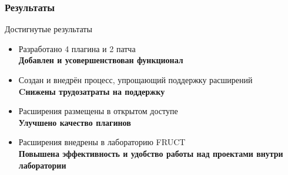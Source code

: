 \documentclass[unicode]{beamer}
\begin{document}
\begin{comment}

На слайде отображена страница с одним из плагинов на хостинге проектов гитхаб.

Исходные коды расширений были размещены в открытом доступе. Один из патчей был
размещен на официальном сайте Redmine и ждёт рассмотрения на принятие в кодовую
базу проекта. Патч, который вносит улучшения в плагин для обзора кода, был
принят автором плагина и текущая версия плагина уже содержит данное улучшение.

Исходные коды 4 разработанных плагинов выложены на хостинг проектов github. Был
произведён анонс одного из плагинов, для того, чтобы привлечь пользователей.
При помощи подобной рекламы было получено было получено 6 отзывов и 3 патча от
8 пользователей. Списое отзывов и патчей отображены на слайде.
Полученные патчи были приняты в кодовую базу плагина, а на основе отзывов
внесены улучшения. Стоит отметить, что один из пользователей портировал плагин
в схожую систему управления проектов и внёс множество улучшений, которые в
последствии были перенесены в оригинальный плагин.

Таким образом плагин доказал свою востребованность, а взаимодействие с
сообществом позволило улучшить его качество.
 
\end{comment}


\begin{frame}
\transwipe[direction=90]
\frametitle{Результаты}
\begin{block}{Достигнутые результаты}
\begin{itemize}
  \item Разработано 4 плагина и 2 патча \\ 
    \textbf{Добавлен и усовершенствован функционал}
    \vspace{8pt}
  
  \item Создан и внедрён процесс, упрощающий поддержку расширений \\
    \textbf{Cнижены трудозатраты на поддержку}
    \vspace{8pt}
  
  \item Расширения размещены в открытом доступе \\
    \textbf{Улучшено качество плагинов}
    \vspace{8pt}
  
  \item Расширения внедрены в лабораторию FRUCT \\
    \textbf{Повышена эффективность и удобство работы над проектами внутри
  лаборатории}
\end{itemize}
\end{block}
\end{frame}

\begin{comment}

--- Перечислить все пункты ---

\end{comment}
\end{document}
